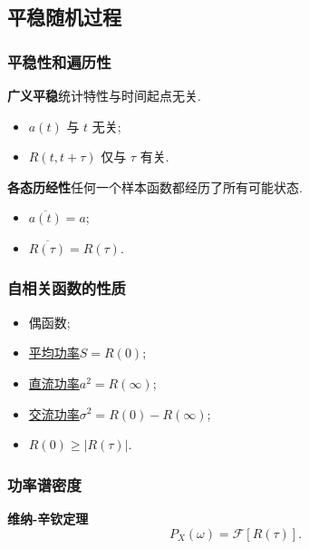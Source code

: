 \subsection{平稳随机过程}
\subsubsection{平稳性和遍历性}
\textbf{广义平稳}\quad 统计特性与时间起点无关.
\begin{itemize}
    \item $a(t)$ 与 $t$ 无关;
    \item $R(t,t+\tau)$ 仅与 $\tau$ 有关.
\end{itemize}

\textbf{各态历经性}\quad 任何一个样本函数都经历了所有可能状态.
\begin{itemize}
    \item $\overline{a(t)}=a$;
    \item $\overline{R(\tau)}=R(\tau)$.
\end{itemize}

\subsubsection{自相关函数的性质}
\begin{itemize}
    \item 偶函数;
    \item \underline{平均功率}\quad $S=R(0)$;
    \item \underline{直流功率}\quad $a^2=R(\infty)$;
    \item \underline{交流功率}\quad $\sigma^2=R(0)-R(\infty)$;
    \item $R(0)\geq|R(\tau)|$.
\end{itemize}

\subsubsection{功率谱密度}
\textbf{维纳-辛钦定理}
\begin{equation}
    P_X(\omega)=\mathcal{F}[R(\tau)].
\end{equation}
